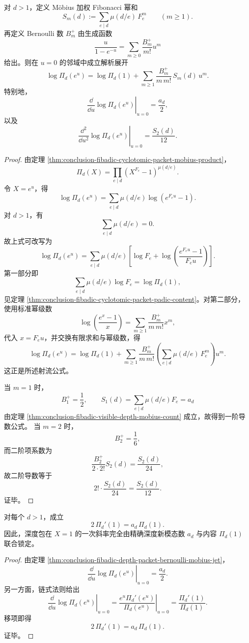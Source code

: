 \begin{theorem}[深度包在 \texorpdfstring{$X=1$}{X=1} 邻域的 Bernoulli--Möbius 射流公式]\label{thm:conclusion-fibadic-depth-packet-bernoulli-mobius-jet}
对 \(d>1\)，定义 Möbius 加权 Fibonacci 幂和
\[
S_m(d):=\sum_{e\mid d}\mu(d/e)\,F_e^m
\qquad(m\ge 1).
\]
再定义 Bernoulli 数 \(B_m^+\) 由生成函数
\[
\frac{u}{1-e^{-u}}=\sum_{m\ge 0}\frac{B_m^+}{m!}u^m
\]
给出。则在 \(u=0\) 的邻域中成立解析展开
\[
\log \Pi_d(e^u)
=
\log \Pi_d(1)
+
\sum_{m\ge 1}
\frac{B_m^+}{m\,m!}\,S_m(d)\,u^m.
\]
特别地，
\[
\left.\frac{\dd}{\dd u}\log \Pi_d(e^u)\right|_{u=0}
=
\frac{a_d}{2},
\]
以及
\[
\left.\frac{\dd^2}{\dd u^2}\log \Pi_d(e^u)\right|_{u=0}
=
\frac{S_2(d)}{12}.
\]
\end{theorem}
\begin{proof}
由定理 \ref{thm:conclusion-fibadic-cyclotomic-packet-mobius-product}，
\[
\Pi_d(X)=\prod_{e\mid d}(X^{F_e}-1)^{\mu(d/e)}.
\]
令 \(X=e^u\)，得
\[
\log \Pi_d(e^u)
=
\sum_{e\mid d}\mu(d/e)\log(e^{F_eu}-1).
\]
对 \(d>1\)，有
\[
\sum_{e\mid d}\mu(d/e)=0.
\]
故上式可改写为
\[
\log \Pi_d(e^u)
=
\sum_{e\mid d}\mu(d/e)
\left[
\log F_e+\log\!\left(\frac{e^{F_eu}-1}{F_eu}\right)
\right].
\]
第一部分即
\[
\sum_{e\mid d}\mu(d/e)\log F_e=\log \Pi_d(1),
\]
见定理 \ref{thm:conclusion-fibadic-cyclotomic-packet-padic-content}。对第二部分，使用标准幂级数
\[
\log\!\left(\frac{e^x-1}{x}\right)
=
\sum_{m\ge 1}\frac{B_m^+}{m\,m!}x^m,
\]
代入 \(x=F_eu\)，并交换有限求和与幂级数，得
\[
\log \Pi_d(e^u)
=
\log \Pi_d(1)
+
\sum_{m\ge 1}\frac{B_m^+}{m\,m!}
\left(
\sum_{e\mid d}\mu(d/e)\,F_e^m
\right)u^m.
\]
这正是所述射流公式。

当 \(m=1\) 时，
\[
B_1^+=\frac12,
\qquad
S_1(d)=\sum_{e\mid d}\mu(d/e)F_e=a_d
\]
由定理 \ref{thm:conclusion-fibadic-visible-depth-mobius-count} 成立，故得到一阶导数公式。
当 \(m=2\) 时，
\[
B_2^+=\frac16,
\]
而二阶项系数为
\[
\frac{B_2^+}{2\cdot 2!}S_2(d)=\frac{S_2(d)}{24},
\]
故二阶导数等于
\[
2!\cdot \frac{S_2(d)}{24}=\frac{S_2(d)}{12}.
\]
证毕。
\end{proof}

\begin{corollary}[深度包在 \texorpdfstring{$X=1$}{X=1} 处的一次斜率由新模态数控制]\label{cor:conclusion-fibadic-depth-packet-slope-at-one}
对每个 \(d>1\)，成立
\[
2\,\Pi_d'(1)=a_d\,\Pi_d(1).
\]
因此，深度包在 \(X=1\) 的一次斜率完全由精确深度新模态数 \(a_d\) 与内容 \(\Pi_d(1)\) 联合锁定。
\end{corollary}
\begin{proof}
由定理 \ref{thm:conclusion-fibadic-depth-packet-bernoulli-mobius-jet}，
\[
\left.\frac{\dd}{\dd u}\log \Pi_d(e^u)\right|_{u=0}=\frac{a_d}{2}.
\]
另一方面，链式法则给出
\[
\left.\frac{\dd}{\dd u}\log \Pi_d(e^u)\right|_{u=0}
=
\left.\frac{e^u\Pi_d'(e^u)}{\Pi_d(e^u)}\right|_{u=0}
=
\frac{\Pi_d'(1)}{\Pi_d(1)}.
\]
移项即得
\[
2\,\Pi_d'(1)=a_d\,\Pi_d(1).
\]
证毕。
\end{proof}

